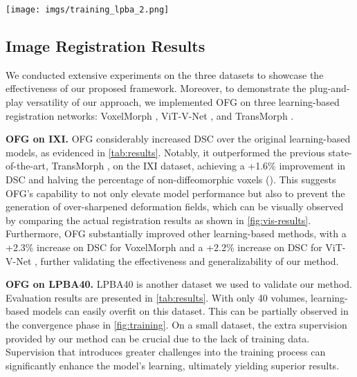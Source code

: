 \documentclass[10pt,twocolumn,letterpaper]{article}
\begin{document}
\begin{figure*}[t]
    \begin{center}
       \texttt{[image: imgs/training\_lpba\_2.png]}
    \end{center}
    \caption{Visualization of training process vs. validation DSC for models on LPBA40. The self-training strategy utilizes deformation fields from a pre-trained network as pseudo-ground truth. In contrast, optimized self-training iteratively refines the deformation these fields, and then uses them as pseudo-ground truth. Our proposed method is highlighted for its superior outcomes. Notably, self-training schema underperforms, primarily due to complexities in convergence.}
    \label{fig:training}
\end{figure*}

\subsection{Image Registration Results}

We conducted extensive experiments on the three datasets to showcase the effectiveness of our proposed framework. Moreover, to demonstrate the plug-and-play versatility of our approach, we implemented OFG on three learning-based registration networks: VoxelMorph \cite{Balakrishnan_2019}, ViT-V-Net \cite{chen2021vitvnet}, and TransMorph \cite{Chen_2022}.


\textbf{OFG on IXI.} OFG considerably increased DSC over the original learning-based models, as evidenced in \cref{tab:results}. Notably, it outperformed the previous state-of-the-art, TransMorph \cite{Chen_2022}, on the IXI dataset, achieving a +1.6\% improvement in DSC and halving the percentage of non-diffeomorphic voxels (). This suggests OFG's capability to not only elevate model performance but also to prevent the generation of over-sharpened deformation fields, which can be visually observed by comparing the actual registration results as shown in \cref{fig:vis-results}.
Furthermore, OFG substantially improved other learning-based methods, with a +2.3\% increase on DSC for VoxelMorph \cite{Balakrishnan_2019} and a +2.2\% increase on DSC for ViT-V-Net \cite{chen2021vitvnet}, further validating the effectiveness and generalizability of our method.




\textbf{OFG on LPBA40.} LPBA40 \cite{lpba} is another dataset we used to validate our method. Evaluation results are presented in \cref{tab:results}. With only 40 volumes, learning-based models can easily overfit on this dataset. This can be partially observed in the convergence phase in \cref{fig:training}.
On a small dataset, the extra supervision provided by our method can be crucial due to the lack of training data. Supervision that introduces greater challenges into the training process can significantly enhance the model's learning, ultimately yielding superior results.
\end{document}
